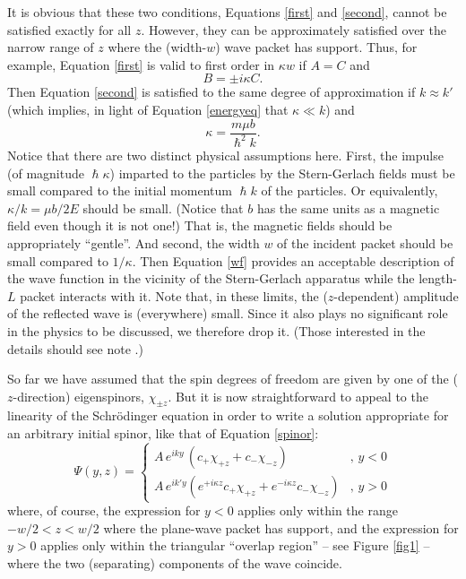 \documentclass[aps,prc,onecolumn,letterpaper,floatfix,12pt]{revtex4}
\renewcommand{\hbar}{\hslash}
\begin{document}
It is obvious that these two conditions, Equations \eqref{first} and
\eqref{second}, cannot be satisfied exactly for all $z$.  However,
they can be approximately satisfied over the narrow range of $z$ where
the (width-$w$) wave packet has support.  Thus, for example, Equation
\eqref{first} is valid to first order in $\kappa w$ if $A =
C$ and
\begin{equation}
B = \pm i \kappa C.
\end{equation}
Then Equation \eqref{second} is satisfied to the same degree of
approximation if $k
\approx k'$ (which implies, in light of Equation \eqref{energyeq} that $\kappa \ll k$) and
\begin{equation}
\kappa = \frac{ m \mu b}{\hbar^2 k}.
\end{equation}
Notice that there are two distinct physical assumptions here.  First,
the impulse (of magnitude $\hbar \kappa$) imparted to the particles by
the Stern-Gerlach fields must be small compared to the initial
momentum $\hbar k$ of the particles.  Or equivalently, $\kappa / k =
\mu b / 2E$ should be small.  (Notice that $b$ has the same units as a
magnetic field even though it is not one!)  That is,  the magnetic fields should be
appropriately ``gentle''.  And second, the width $w$ of the incident
packet should be small compared to $1/\kappa$.  Then Equation
\eqref{wf} provides an acceptable description of the wave function in
the vicinity of the Stern-Gerlach apparatus while the length-$L$
packet interacts with it.  Note that, in these limits, the
($z$-dependent) amplitude of the reflected wave is (everywhere)
small.  Since it also plays no significant role in the physics to be
discussed, we therefore drop it.  (Those interested in the details
should see note \cite{reflectedwave}.)

So far we have assumed that the spin degrees of freedom are given by
one of the ($z$-direction) eigenspinors, $\chi_{\pm z}$.  But it is now
straightforward to appeal to the linearity of the
Schr\"odinger equation in order to write a solution appropriate for an
arbitrary initial spinor, like that of Equation \eqref{spinor}:
\begin{equation}
\Psi(y,z) = \left\{ \begin{array}{cc}
A \, e^{i k y} \, \left(c_+\chi_{+z} + c_- \chi_{-z} \right) & , \, y < 0 \\
A \, e^{i k' y} \left( e^{+i \kappa z} c_+ \chi_{+z} + e^{-i \kappa z}
  c_- \chi_{-z} \right) & , \,  y > 0 
\end{array} \right. 
\label{wf2}
\end{equation}
where, of course, the expression for $y<0$ applies only within the
range $-w/2 < z < w/2$ where the plane-wave packet has support, and
the expression for $y>0$ applies only within the triangular ``overlap region''
-- see Figure \ref{fig1} -- where the two (separating) components of
the wave coincide. 
\end{document}
